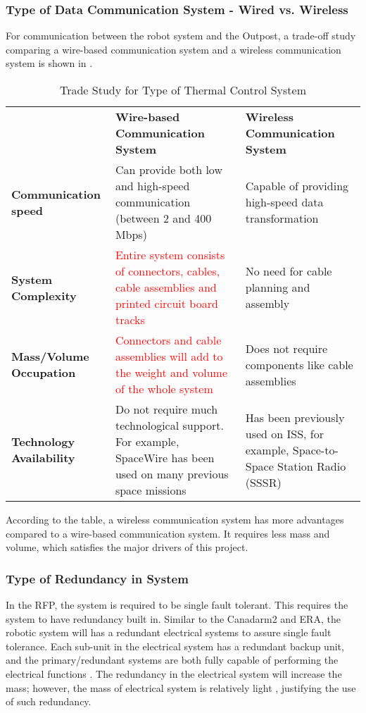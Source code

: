 \subsubsection{Type of Data Communication System - Wired vs. Wireless}
\label{sect:datacomm_to}
For communication between the robot system and the Outpost, a trade-off study comparing a wire-based communication system and a wireless communication system is shown in .
\begin{table}[H]
\caption{Trade Study for Type of Thermal Control System}
\begin{tabular}{|P{3.5cm}|P{5.8cm}|P{5.8cm}|}
\hline
	&	\textbf{Wire-based Communication System}	&	\textbf{Wireless Communication System}	\\\hhline{|=|=|=|}
\textbf{Communication speed}	&
\textcolor{OliveGreen}{Can provide both low and high-speed communication (between 2 and 400 \si{\mega bps}) \cite{spacewire_comm}}	&
\textcolor{OliveGreen}{Capable of providing high-speed data transformation \cite{CCSDS_design}}	\\\hline
\textbf{System Complexity}	&
\textcolor{red}{Entire system consists of connectors, cables, cable assemblies and printed circuit board tracks \cite{spacewire_comm}}	&
\textcolor{OliveGreen}{No need for cable planning and assembly \cite{CCSDS_design}}	\\\hline
\textbf{Mass/Volume Occupation}	&
\textcolor{red}{Connectors and cable assemblies will add to the weight and volume of the whole system \cite{spacewire_comm}}	&
\textcolor{OliveGreen}{Does not require components like cable assemblies}	\\\hline
\textbf{Technology Availability}	&
\textcolor{OliveGreen}{Do not require much technological support. For example, SpaceWire has been used on many previous space missions \cite{spacewire_uses}}	&
\textcolor{OliveGreen}{Has been previously used on ISS, for example, Space-to-Space Station Radio (SSSR) \cite{commtracksys}}	\\\hline
\end{tabular}
\label{tab:datacommto}
\end{table}
According to the table, a wireless communication system has more advantages compared to a wire-based communication system. It requires less mass and volume, which satisfies the major drivers of this project.

\subsubsection{Type of Redundancy in System}
\label{sect:redundancy_to}
In the RFP, the system is required to be single fault tolerant. This requires the system to have redundancy built in. Similar to the Canadarm2 and ERA, the robotic system will has a redundant electrical systems to assure single fault tolerance. Each sub-unit in the electrical system has a redundant backup unit, and the primary/redundant systems are both fully capable of performing the electrical functions \cite{ISS_robotcompare}. The redundancy in the electrical system will increase the mass; however, the mass of electrical system is relatively light \cite{AER407_Mech}, justifying the use of such redundancy.

